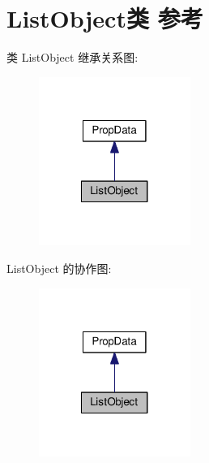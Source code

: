 \hypertarget{class_list_object}{\section{List\+Object类 参考}
\label{class_list_object}
}


类 List\+Object 继承关系图\+:
\nopagebreak
\begin{figure}[H]
\begin{center}
\leavevmode
\includegraphics[width=140pt]{class_list_object__inherit__graph}
\end{center}
\end{figure}


List\+Object 的协作图\+:
\nopagebreak
\begin{figure}[H]
\begin{center}
\leavevmode
\includegraphics[width=140pt]{class_list_object__coll__graph}
\end{center}
\end{figure}
